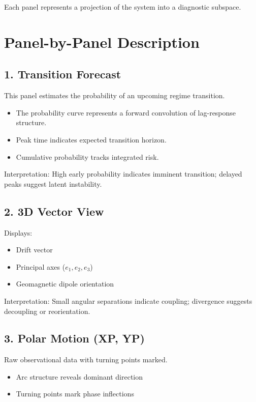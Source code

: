 \documentclass[11pt]{article}
\begin{document}
Each panel represents a projection of the system into a diagnostic subspace.

\section{Panel-by-Panel Description}

\subsection{1. Transition Forecast}

This panel estimates the probability of an upcoming regime transition.

\begin{itemize}
\item The probability curve represents a forward convolution of lag-response structure.
\item Peak time indicates expected transition horizon.
\item Cumulative probability tracks integrated risk.
\end{itemize}

Interpretation:
High early probability indicates imminent transition; delayed peaks suggest latent instability.

\subsection{2. 3D Vector View}

Displays:

\begin{itemize}
\item Drift vector
\item Principal axes ($e_1, e_2, e_3$)
\item Geomagnetic dipole orientation
\end{itemize}

Interpretation:
Small angular separations indicate coupling; divergence suggests decoupling or reorientation.

\subsection{3. Polar Motion (XP, YP)}

Raw observational data with turning points marked.

\begin{itemize}
\item Arc structure reveals dominant direction
\item Turning points mark phase inflections
\end{itemize}
\end{document}
